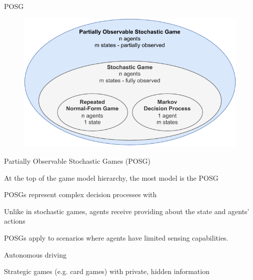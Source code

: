 \begin{frame}{POSG}

\begin{figure}
    \centering
    \includegraphics{images/chapter_3/POSG_hierarchy.pdf}
\end{figure}
    
\end{frame}

\begin{frame}{Partially Observable Stochastic Games (POSG)}
    \vspace{5pt}
    \blist
        \item At the top of the game model hierarchy, the most  model is the POSG
        \item POSGs represent complex decision processes with 
        \item Unlike in stochastic games, agents receive  providing  about the state and agents' actions
        \item POSGs apply to scenarios where agents have limited sensing capabilities.
        \blist
            \item Autonomous driving
            \item Strategic games (e.g. card games) with private, hidden information
        \elist
    \elist
    
\end{frame}

